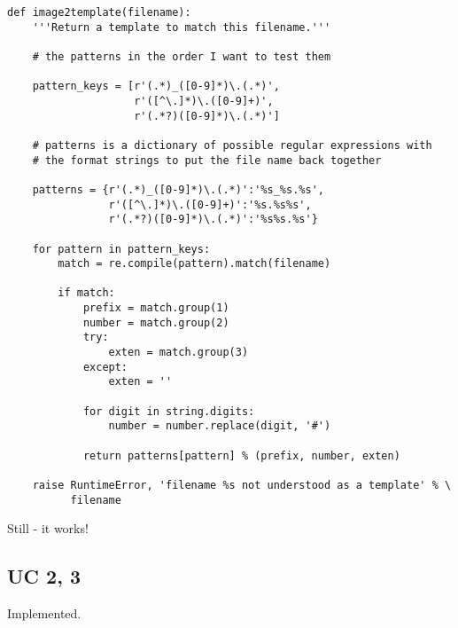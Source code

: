 \documentclass[a4paper, 11pt]{article}
\begin{document}
{
\tiny
\begin{verbatim}
def image2template(filename):
    '''Return a template to match this filename.'''

    # the patterns in the order I want to test them

    pattern_keys = [r'(.*)_([0-9]*)\.(.*)',
                    r'([^\.]*)\.([0-9]+)',
                    r'(.*?)([0-9]*)\.(.*)']

    # patterns is a dictionary of possible regular expressions with
    # the format strings to put the file name back together

    patterns = {r'(.*)_([0-9]*)\.(.*)':'%s_%s.%s',
                r'([^\.]*)\.([0-9]+)':'%s.%s%s',
                r'(.*?)([0-9]*)\.(.*)':'%s%s.%s'}

    for pattern in pattern_keys:
        match = re.compile(pattern).match(filename)

        if match:
            prefix = match.group(1)
            number = match.group(2)
            try:
                exten = match.group(3)
            except:
                exten = ''

            for digit in string.digits:
                number = number.replace(digit, '#')
                
            return patterns[pattern] % (prefix, number, exten)

    raise RuntimeError, 'filename %s not understood as a template' % \
          filename
\end{verbatim}
}

Still - it works!

\subsection{UC 2, 3}

Implemented.
\end{document}
